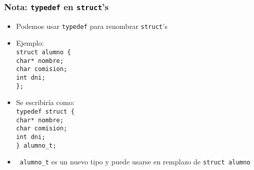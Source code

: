 \documentclass[aspectratio=169]{beamer}
\begin{document}
\begin{frame}[fragile]
    \frametitle{Nota: \texttt{typedef} en \texttt{struct}'s}
    \large
    \begin{itemize}
    \setlength\itemsep{0.3cm}
    \item<1->[-] Podemos usar \textcolor{naranjauca}{\texttt{typedef}} para renombrar \textcolor{naranjauca}{\texttt{struct}'s}
    \item<2->[-] Ejemplo:\\
    \vspace{-0.5cm}
    \normalsize
    \hspace{4cm}\textcolor{verdeuca}{\texttt{struct alumno \{}}\\
    \hspace{5cm}\textcolor{verdeuca}{\texttt{char* nombre;}}\\
    \hspace{5cm}\textcolor{verdeuca}{\texttt{char comision;}}\\
    \hspace{5cm}\textcolor{verdeuca}{\texttt{int dni;}}\\
    \hspace{4cm}\textcolor{verdeuca}{\texttt{\};}}
    \item<3->[-] \large Se escribiría como:\\
    \vspace{-0.5cm}
    \normalsize
    \hspace{4cm}\textcolor{naranjauca}{\texttt{typedef }}\textcolor{verdeuca}{\texttt{struct \{}}\\
    \hspace{5cm}\textcolor{verdeuca}{\texttt{char* nombre;}}\\
    \hspace{5cm}\textcolor{verdeuca}{\texttt{char comision;}}\\
    \hspace{5cm}\textcolor{verdeuca}{\texttt{int dni;}}\\
    \hspace{4cm}\textcolor{verdeuca}{\texttt{\}}}\textcolor{naranjauca}{\texttt{ alumno\_t}}\textcolor{verdeuca}{\texttt{;}}
    \item<4->[-] \large \textcolor{naranjauca}{\texttt{ alumno\_t}} es un nuevo tipo y puede usarse en remplazo de \textcolor{verdeuca}{\texttt{struct alumno}}
    \end{itemize}
\end{frame}
\end{document}
